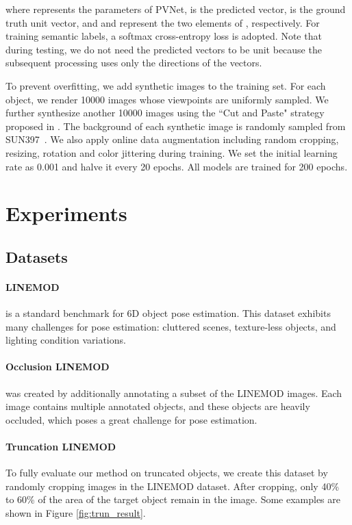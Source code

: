 \documentclass[10pt,twocolumn,letterpaper]{article}
\begin{document}
where  represents the parameters of PVNet,  is the predicted vector,  is the ground truth unit vector, and  and  represent the two elements of , respectively. For training semantic labels, a softmax cross-entropy loss is adopted. Note that during testing, we do not need the predicted vectors to be unit because the subsequent processing uses only the directions of the vectors.

To prevent overfitting, we add synthetic images to the training set. For each object, we render 10000 images whose viewpoints are uniformly sampled. We further synthesize another 10000 images using the ``Cut and Paste" strategy proposed in \cite{dwibedi2017cut}. The background of each synthetic image is randomly sampled from SUN397~\cite{xiao2010sun}. We also apply online data augmentation including random cropping, resizing, rotation and color jittering during training. We set the initial learning rate as 0.001 and halve it every 20 epochs. All models are trained for 200 epochs.
 \section{Experiments}

\subsection{Datasets}

\paragraph{LINEMOD~\cite{hinterstoisser2012model}} is a standard benchmark for 6D object pose estimation. This dataset exhibits many challenges for pose estimation: cluttered scenes, texture-less objects, and lighting condition variations.

\paragraph{Occlusion LINEMOD~\cite{brachmann2014learning}} was created by additionally annotating a subset of the LINEMOD images. Each image contains multiple annotated objects, and these objects are heavily occluded, which poses a great challenge for pose estimation.

\paragraph{Truncation LINEMOD} To fully evaluate our method on truncated objects, we create this dataset by randomly cropping images in the LINEMOD dataset. After cropping, only 40\% to 60\% of the area of the target object remain in the image. 
Some examples are shown in Figure \ref{fig:trun_result}. 
\end{document}
